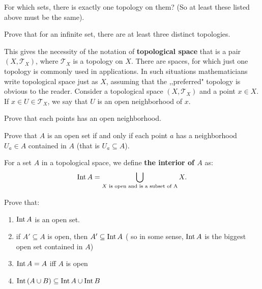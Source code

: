 \begin{prob}
	For which sets, there is exactly one topology on them? (So at least
  these listed above must be the same).
\end{prob}

\begin{prob}
	Prove that for an infinite set, there are at least three distinct
  topologies.
\end{prob}

\noindent This gives the necessity of the notation of \textbf{topological space} that is a pair $(X,\mathcal T_X)$, where $\mathcal T_X$ is a topology on
$X$. There are spaces, for which just one topology is commonly used in applications. In such situations mathematicians write topological space just as
$X$, assuming that the ,,preferred" topology is obvious to the reader.
Consider a topological space $(X,\mathcal T_X)$ and a point $x\in X$.
If $x\in U\in \mathcal T_X$, we say that $U$ is an open neighborhood
of $x$.

\begin{prob}
  Prove that each points has an open neighborhood.
\end{prob}

\begin{prob}
  Prove that $A$ is an open set if and only if each point $a$ has
  a neighborhood $U_a\in A$ contained in $A$
  (that is $U_a\subseteq A$).
\end{prob}

\noindent For a set $A$ in a topological space, we define \textbf{the
interior of $A$} as:
$$\text{Int\,} A=\bigcup_{X \text{ is open and is a subset of A}} X.$$

\begin{prob}
  Prove that:
  \begin{enumerate}
    \item $\text{Int\,} A$ is an open set.
    \item if $A'\subseteq A$ is open, then $A'\subseteq \text{Int\,} A$ (
    so in some sense, $\text{Int\,} A$ is the biggest open set contained in
    $A$)
    \item $\text{Int\,} A = A$ iff $A$ is open
    \item $\text{Int\,} (A\cup B)\subseteq \text{Int\,} A\cup \text{Int\,} B$
  \end{enumerate}
\end{prob}

